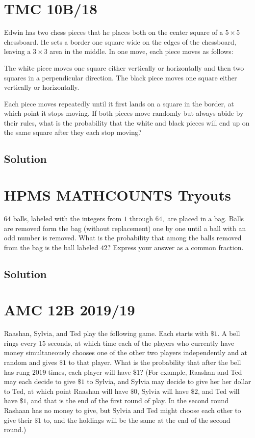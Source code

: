 \documentclass[mast]{lucky}
\begin{document}
\pagebreak\section{TMC 10B/18} Edwin has two chess pieces that he places both on the center square of a $5\times 5$ chessboard. He sets a border one square wide on the edges of the chessboard, leaving a $3\times 3$ area in the middle. In one move, each piece moves as follows:
    \begin{itemize}
\Item The white piece moves one square either vertically or horizontally and then two squares in a perpendicular direction.
\Item The black piece moves one square either vertically or horizontally.
\end{itemize}
Each piece moves repeatedly until it first lands on a square in the border, at which point it stops moving. If both pieces move randomly but always abide by their rules, what is the probability that the white and black pieces will end up on the same square after they each stop moving?
\subsection{Solution}    





\pagebreak\section{HPMS MATHCOUNTS Tryouts} $64$ balls, labeled with the integers from $1$ through $64,$ are placed in a bag. Balls are removed form the bag (without replacement) one by one until a ball with an odd number is removed. What is the probability that among the balls removed from the bag is the ball labeled $42?$ Express your answer as a common fraction.
\subsection{Solution}




\pagebreak\section{AMC 12B 2019/19} Raashan, Sylvia, and Ted play the following game. Each starts with $\$ 1$. A bell rings every $15$ seconds, at which time each of the players who currently have money simultaneously chooses one of the other two players independently and at random and gives $\$1$ to that player. What is the probability that after the bell has rung $2019$ times, each player will have $\$1$? (For example, Raashan and Ted may each decide to give $\$1$ to Sylvia, and Sylvia may decide to give her her dollar to Ted, at which point Raashan will have $\$0$, Sylvia will have $\$2$, and Ted will have $\$1$, and that is the end of the first round of play. In the second round Rashaan has no money to give, but Sylvia and Ted might choose each other to give their $\$1$ to, and the holdings will be the same at the end of the second round.)
\end{document}

